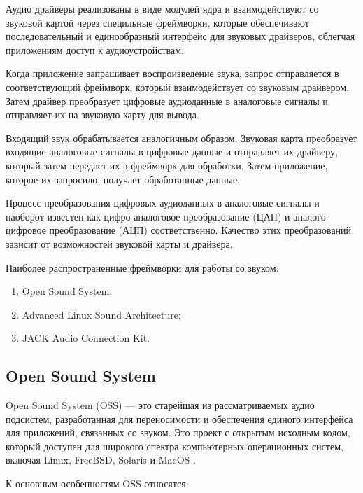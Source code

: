Аудио драйверы реализованы в виде модулей ядра и взаимодействуют со звуковой картой через специльные фреймворки, которые обеспечивают последовательный и единообразный интерфейс для звуковых драйверов, облегчая приложениям доступ к аудиоустройствам. 

Когда приложение запрашивает воспроизведение звука, запрос отправляется в соответствующий фреймворк, который взаимодействует со звуковым драйвером. Затем драйвер преобразует цифровые аудиоданные в аналоговые сигналы и отправляет их на звуковую карту для вывода.

Входящий звук обрабатывается аналогичным образом. Звуковая карта преобразует входящие аналоговые сигналы в цифровые данные и отправляет их драйверу, который затем передает их в фреймворк для обработки. Затем  приложение, которое их запросило, получает обработанные данные.

Процесс преобразования цифровых аудиоданных в аналоговые сигналы и наоборот известен как цифро-аналоговое преобразование (ЦАП) и аналого-цифровое преобразование (АЦП) соответственно. Качество этих преобразований зависит от возможностей звуковой карты и драйвера.

Наиболее распространенные фреймворки для работы со звуком:
\begin{enumerate}
    \item Open Sound System;
    \item Advanced Linux Sound Architecture;
    \item JACK Audio Connection Kit.
\end{enumerate}

\subsection{Open Sound System}

Open Sound System (OSS) --- это старейшая из рассматриваемых аудио подсистем, разработанная для переносимости и обеспечения единого интерфейса для приложений, связанных со звуком. Это проект с открытым исходным кодом, который доступен для широкого спектра компьютерных операционных систем, включая Linux, FreeBSD, Solaris и MacOS \cite{oss}.

К основным особенностям OSS относятся:

